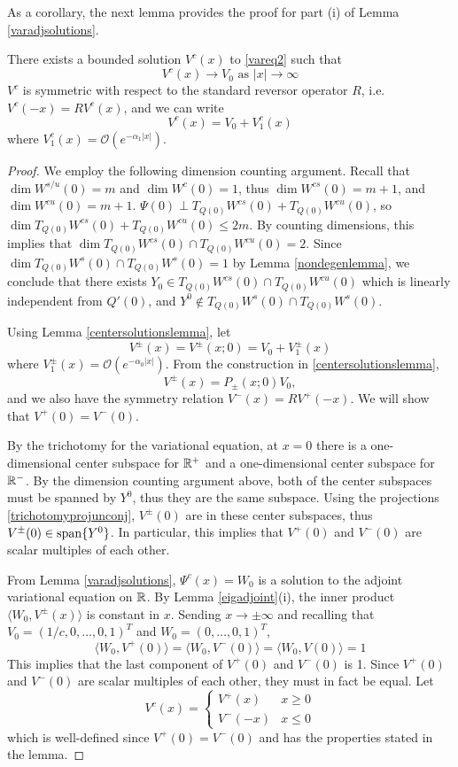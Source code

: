 \documentclass[thesis.tex]{subfiles}
\begin{document}
As a corollary, the next lemma provides the proof for part (i) of Lemma \ref{varadjsolutions}.
 
\begin{lemma}\label{varsolutions}
There exists a bounded solution $V^c(x)$ to \eqref{vareq2} such that 
\begin{equation*}
V^c(x) \rightarrow V_0 \text{ as }|x| \rightarrow \infty
\end{equation*}
$V^c$ is symmetric with respect to the standard reversor operator $R$, i.e. $V^c(-x) = R V^c(x)$, and we can write
\[
V^c(x) = V_0 + V^c_1(x)
\]
where $V^c_1(x) = \mathcal{O}(e^{-\alpha_1 |x|})$.
\begin{proof}
We employ the following dimension counting argument. Recall that $\dim W^{s/u}(0) = m$ and $\dim W^c(0) = 1$, thus $\dim W^{cs}(0) = m + 1$, and $\dim W^{cu}(0) = m + 1$. $\Psi(0) \perp T_{Q(0)}W^{cs}(0) + T_{Q(0)}W^{cu}(0)$, so $\dim T_{Q(0)}W^{cs}(0) + T_{Q(0)}W^{cu}(0) \leq 2m$. By counting dimensions, this implies that $\dim T_{Q(0)}W^{cs}(0) \cap T_{Q(0)}W^{cu}(0) = 2$. Since $\dim T_{Q(0)}W^s(0) \cap T_{Q(0)}W^s(0) = 1$ by Lemma \ref{nondegenlemma}, we conclude that there exists $Y_0 \in T_{Q(0)}W^{cs}(0) \cap T_{Q(0)}W^{cu}(0)$ which is linearly independent from $Q'(0)$, and $Y^0 \notin T_{Q(0)}W^s(0) \cap T_{Q(0)}W^s(0)$.

Using Lemma \ref{centersolutionslemma}, let
\[
V^\pm(x) = V^\pm(x; 0) = V_0 + V_1^\pm(x)
\]
where $V_1^\pm(x) = \mathcal{O}(e^{-\alpha_0 |x|})$. From the construction in \ref{centersolutionslemma},
\[
V^\pm(x) = P_\pm(x; 0) V_0,
\]
and we also have the symmetry relation $V^-(x) = R V^+(-x)$. We will show that $V^+(0) = V^-(0)$.

By the trichotomy for the variational equation, at $x = 0$ there is a one-dimensional center subspace for $\mathbb{R}^+$ and a one-dimensional center subspace for $\mathbb{R}^-$. By the dimension counting argument above, both of the center subspaces must be spanned by $Y^0$, thus they are the same subspace. Using the projections \eqref{trichotomyprojunconj}, $V^\pm(0)$ are in these center subspaces, thus $V^\pm(0) \in \mathop\mathrm{span}\nolimits \{Y^0 \}$. In particular, this implies that $V^+(0)$ and $V^-(0)$ are scalar multiples of each other. 

From Lemma \ref{varadjsolutions}, $\Psi^c(x) = W_0$ is a solution to the adjoint variational equation on $\mathbb{R}$. By Lemma \ref{eigadjoint}(i), the inner product $\langle W_0, V^\pm(x) \rangle$ is constant in $x$. Sending $x \rightarrow \pm \infty$ and recalling that $V_0 = (1/c, 0, \dots, 0, 1)^T $ and $W_0 = (0, \dots, 0, 1)^T$,
\[
\langle W_0, V^+(0) \rangle = \langle W_0, V^-(0) \rangle
= \langle W_0, V(0) \rangle = 1
\]
This implies that the last component of $V^+(0)$ and $V^-(0)$ is 1. Since $V^+(0)$ and $V^-(0)$ are scalar multiples of each other, they must in fact be equal. Let
\[
V^c(x) = \begin{cases}
V^+(x) & x \geq 0 \\
V^-(-x) & x \leq 0 
\end{cases}
\]
which is well-defined since $V^+(0) = V^-(0)$ and has the properties stated in the lemma.
\end{proof}
\end{lemma}
\end{document}
